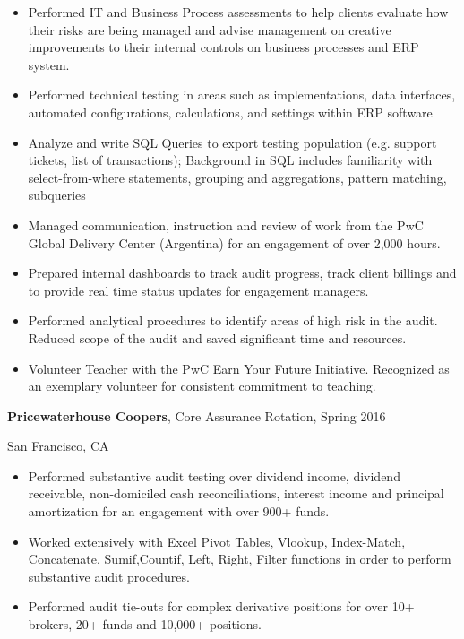 \documentclass[margin,line]{res}
\begin{document}
\begin{resume}
\begin{itemize}[leftmargin=*]
\item Performed IT and Business Process assessments to help clients evaluate how their risks are being managed and advise management on creative improvements to their internal controls on business processes and ERP system.
\item Performed technical testing in areas such as implementations, data interfaces, automated configurations, calculations, and settings within ERP software 
\item Analyze and write SQL Queries to export testing population (e.g. support tickets, list of transactions); Background in SQL includes familiarity with select-from-where statements, grouping and aggregations, pattern matching, subqueries
\item Managed communication, instruction and review of work from the PwC Global Delivery Center (Argentina) for an engagement of over 2,000 hours.  
\item Prepared internal dashboards to track audit progress, track client billings and to provide real time status updates for engagement managers.
\item Performed analytical procedures to identify areas of high risk in the audit. Reduced scope of the audit and saved significant time and resources.  
\item Volunteer Teacher with the PwC Earn Your Future Initiative. Recognized as an exemplary volunteer for consistent commitment to teaching.  
\end{itemize}
\vspace*{1.5mm}


\vspace*{-3mm}
{\bf Pricewaterhouse Coopers},  Core Assurance Rotation, Spring 2016

\vspace*{-4mm}San Francisco, CA
\begin{itemize}[leftmargin=*] 
\item Performed substantive audit testing over dividend income, dividend receivable, non-domiciled cash reconciliations, interest income and principal amortization for an engagement with over 900+ funds.
\item Worked extensively with Excel Pivot Tables, Vlookup, Index-Match, Concatenate, Sumif,Countif, Left, Right, Filter functions in order to perform substantive audit procedures. 
\item Performed audit tie-outs for complex derivative positions for over 10+ brokers, 20+ funds and 10,000+ positions.
\end{itemize}
\vspace*{1.5mm}



\end{resume}
\end{document}
